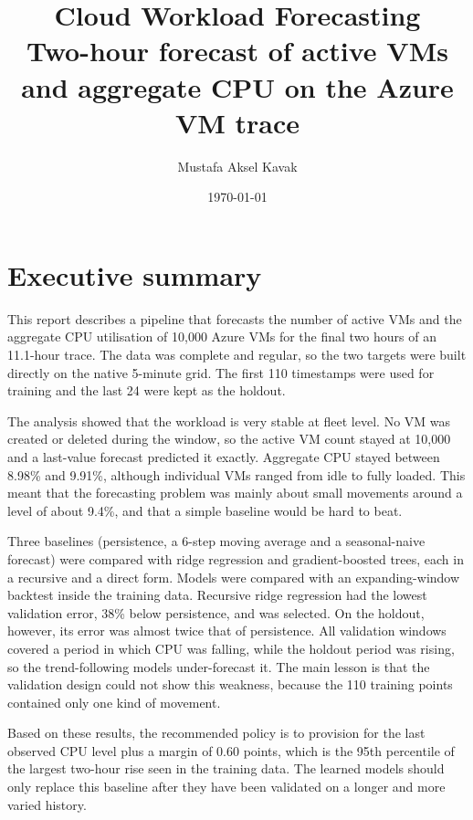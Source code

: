 \documentclass[11pt,a4paper]{article}
\title{\textbf{Cloud Workload Forecasting}\\[4pt]\large Two-hour forecast of active VMs and aggregate CPU on the Azure VM trace}
\author{Mustafa Aksel Kavak}
\date{\today}
\begin{document}
\maketitle

\section{Executive summary}

This report describes a pipeline that forecasts the number of active VMs and the aggregate CPU utilisation of 10,000 Azure VMs for the final two hours of an 11.1-hour trace. The data was complete and regular, so the two targets were built directly on the native 5-minute grid. The first 110 timestamps were used for training and the last 24 were kept as the holdout.

The analysis showed that the workload is very stable at fleet level. No VM was created or deleted during the window, so the active VM count stayed at 10,000 and a last-value forecast predicted it exactly. Aggregate CPU stayed between 8.98\% and 9.91\%, although individual VMs ranged from idle to fully loaded. This meant that the forecasting problem was mainly about small movements around a level of about 9.4\%, and that a simple baseline would be hard to beat.

Three baselines (persistence, a 6-step moving average and a seasonal-naive forecast) were compared with ridge regression and gradient-boosted trees, each in a recursive and a direct form. Models were compared with an expanding-window backtest inside the training data. Recursive ridge regression had the lowest validation error, 38\% below persistence, and was selected. On the holdout, however, its error was almost twice that of persistence. All validation windows covered a period in which CPU was falling, while the holdout period was rising, so the trend-following models under-forecast it. The main lesson is that the validation design could not show this weakness, because the 110 training points contained only one kind of movement.

Based on these results, the recommended policy is to provision for the last observed CPU level plus a margin of 0.60 points, which is the 95th percentile of the largest two-hour rise seen in the training data. The learned models should only replace this baseline after they have been validated on a longer and more varied history.

\end{document}
